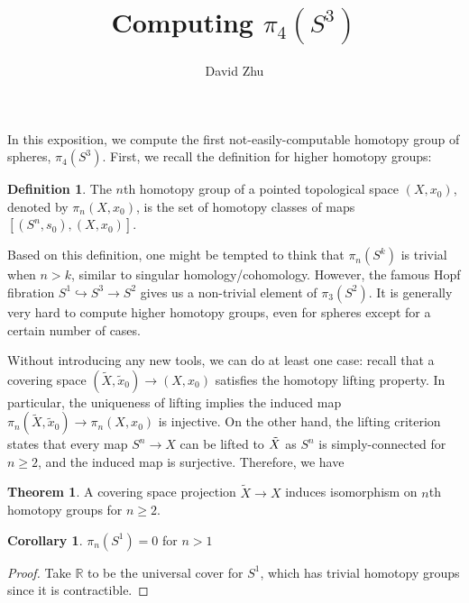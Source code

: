 \documentclass{article}
\title{Computing $\pi_4(S^3)$}
\author{David Zhu}
\theoremstyle{definition}
\newtheorem{theorem}{Theorem}[section]
\theoremstyle{definition}
\theoremstyle{definition}
\theoremstyle{definition}
\newtheorem{definition}{Definition}[theorem]
\theoremstyle{definition}
\newtheorem{corollary}{Corollary}[theorem]
\theoremstyle{definition}
\begin{document}
\maketitle


In this exposition, we compute the first not-easily-computable homotopy group of spheres, $\pi_4(S^3)$. First, we recall the definition for higher homotopy groups:

\begin{tcolorbox}[colback=purple!5!white,colframe=purple!75!black]
\begin{definition}
The $n$th homotopy group of a pointed topological space $(X,x_0)$, denoted by $\pi_n(X,x_0)$, is the set of homotopy classes of maps $[(S^n,s_0), (X,x_0)]$.
\end{definition}
\end{tcolorbox}

Based on this definition, one might be tempted to think that $\pi_n(S^k)$ is trivial when $n>k$, similar to singular homology/cohomology. However, the famous Hopf fibration $S^1\hookrightarrow S^3\to S^2$ gives us a non-trivial element of $\pi_3(S^2)$. It is generally very hard to compute higher homotopy groups, even for spheres except for a certain number of cases.

Without introducing any new tools, we can do at least one case: recall that a covering space $(\tilde{X},\tilde{x}_0)\to (X,x_0)$ satisfies the homotopy lifting property. In particular, the uniqueness of lifting implies the induced map $\pi_n(\tilde{X},\tilde{x}_0)\to \pi_n(X,x_0)$ is injective. On the other hand, the lifting criterion states that every map $S^n\to X$ can be lifted to $\Tilde{X}$ as $S^n$ is simply-connected for $n\geq 2$, and the induced map is surjective. Therefore, we have

\begin{tcolorbox}[colback=red!5!white,colframe=red!30!white]
\begin{theorem}
A covering space projection $\tilde{X}\to X$ induces isomorphism on $n$th homotopy groups for $n\geq 2$.
\end{theorem}
\end{tcolorbox}

\begin{tcolorbox}[colback=green!5!white,colframe=green!30!white]
\begin{corollary}
    $\pi_n(S^1)=0$ for $n>1$
\end{corollary}
\end{tcolorbox}
\begin{proof}
    Take $\mathbb{R}$ to be the universal cover for $S^1$, which has trivial homotopy groups since it is contractible.
\end{proof}
\end{document}
